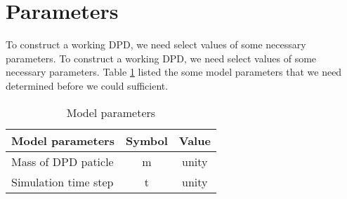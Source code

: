 \section{Parameters}\label{sec:parameters}
To construct a working DPD, we need select values of some necessary parameters. To construct a working DPD, we need select values of some necessary parameters. Table \ref{tab:mopa}  listed the some model parameters that we need determined before we could sufficient.
\begin{table}[htb]
\centering
\caption{Model parameters}\label{tab:mopa}
\begin{tabular}{|l|c|c|}
\hline
\textbf{Model parameters}&\textbf{Symbol}&\textbf{Value}\\
\hline
Mass of DPD paticle&m&unity\\
\hline
Simulation time step& t&unity\\
\hline
\end{tabular}
\end{table}
